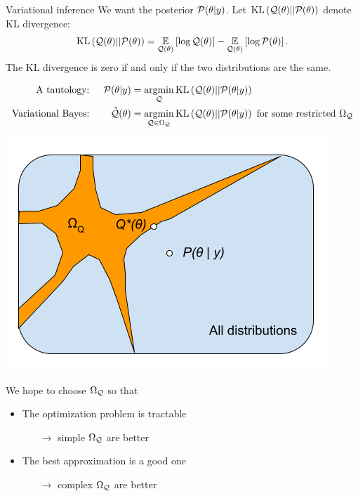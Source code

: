 \documentclass[8pt]{beamer}\usepackage[]{graphicx}\usepackage[]{color}
\begin{document}

\begin{frame}[t]{Variational inference \citep{blei:2016:variational}}
%
We want the posterior $\mathcal{P}(\theta \vert y)$.  Let $\mathrm{KL}\left(\mathcal{Q}(\theta) || \mathcal{P}(\theta)\right)$ denote KL divergence:
%
\begin{align*}
    \mathrm{KL}\left(\mathcal{Q}(\theta) || \mathcal{P}(\theta)\right) = \underset{\mathcal{Q}(\theta)}{\mathbb{E}}\left[\log \mathcal{Q}(\theta)\right] - \underset{\mathcal{Q}(\theta)}{\mathbb{E}}\left[\log \mathcal{P}(\theta)\right].
\end{align*}
%
The KL divergence is zero if and only if the two distributions are the same.

%
\begin{align*}
%
\textrm{A tautology: }&& \post &= \argmin_{\q} \kl{\q(\theta)}{\post} \\
\textrm{Variational Bayes: }&& \qstar(\theta) &= \argmin_{\q \in \qdom} \kl{\q(\theta)}{\post}
\textrm{ for some restricted }\qdom\\
%
\end{align*}
%
\begin{minipage}{0.4\textwidth}
    \includegraphics[width=\textwidth]{static_figures/VB}
\end{minipage}
\begin{minipage}{0.55\textwidth}
We hope to choose $\Omega_{\mathcal{Q}}$ so that
%
\begin{itemize}
\item The optimization problem is tractable
%
\begin{itemize}
\item[$\rightarrow$] simple $\Omega_{\mathcal{Q}}$ are better
\end{itemize}
%
\item The best approximation is a good one
\begin{itemize}
    \item[$\rightarrow$] complex $\Omega_{\mathcal{Q}}$ are better
\end{itemize}    
\end{itemize}


\end{minipage}
\end{frame}
\end{document}
